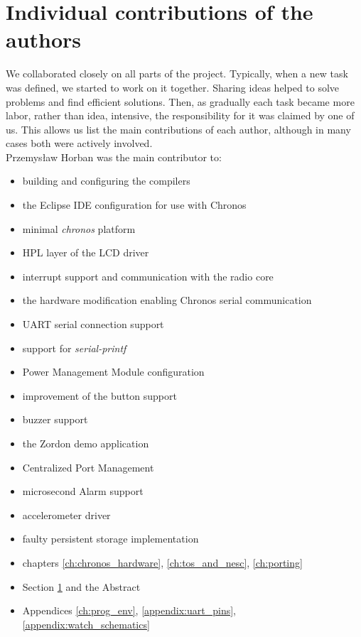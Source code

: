 \section{Individual contributions of the authors}
\label{ch:contributions}

We collaborated closely on all parts of the project. Typically, when a new task was defined, we started to work on it together. Sharing ideas helped to solve problems and find efficient solutions. Then, as gradually each task became more labor, rather than idea, intensive, the responsibility for it was claimed by one of us. This allows us list the main contributions of each author, although in many cases both were actively involved.\\
Przemysław Horban was the main contributor to:
\begin{itemize}\addtolength{\itemsep}{-.35\baselineskip} 
  \item building and configuring the compilers
  \item the Eclipse IDE configuration for use with Chronos
  \item minimal \emph{chronos} platform
  \item HPL layer of the LCD driver
  \item interrupt support and communication with the radio core
  \item the hardware modification enabling Chronos serial communication
  \item UART serial connection support
  \item support for \emph{serial-printf}
  \item Power Management Module configuration
  \item improvement of the button support
  \item buzzer support
  \item the Zordon demo application
  \item Centralized Port Management
  \item microsecond Alarm support
  \item accelerometer driver
  \item faulty persistent storage implementation
  \item chapters \ref{ch:chronos_hardware}, \ref{ch:tos_and_nesc}, \ref{ch:porting}
  \item Section \ref{ch:contributions} and the Abstract
  \item Appendices \ref{ch:prog_env}, \ref{appendix:uart_pins}, \ref{appendix:watch_schematics}
\end{itemize}
